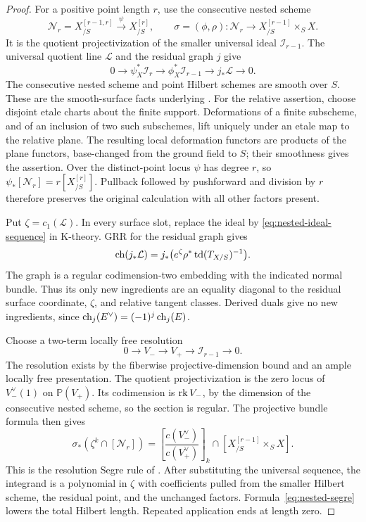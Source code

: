 \begin{proof}
For a positive point length \(r\), use the consecutive nested scheme
\[
 \mathcal N_r=X^{[r-1,r]}_{/S}
 \xrightarrow{\ \psi\ }X^{[r]}_{/S},\qquad
 \sigma=(\phi,\rho):\mathcal N_r\longrightarrow
 X^{[r-1]}_{/S}\times_S X .
 \]
It is the quotient projectivization of the smaller universal ideal
\(\mathcal I_{r-1}\). The universal quotient line \(\mathcal L\)
and the residual graph \(j\) give
\begin{equation}
\label{eq:nested-ideal-sequence}
 0\longrightarrow\psi_X^*\mathcal I_r
 \longrightarrow\phi_X^*\mathcal I_{r-1}
 \longrightarrow j_*\mathcal L\longrightarrow0.
\end{equation}
The consecutive nested scheme and point Hilbert schemes are smooth
over \(S\). These are the smooth-surface facts underlying
\cite[Section 1]{EGL}. For the relative assertion, choose disjoint
etale charts about the finite support. Deformations of a finite
subscheme, and of an inclusion of two such subschemes, lift uniquely
under an etale map to the relative plane. The resulting local
deformation functors are products of the plane functors, base-changed
from the ground field to \(S\); their smoothness gives the assertion.
Over the distinct-point locus \(\psi\) has degree \(r\), so
\(\psi_*[\mathcal N_r]=r[X^{[r]}_{/S}]\).
Pullback followed by pushforward and division by \(r\) therefore
preserves the original calculation with all other factors present.

Put \(\zeta=c_1(\mathcal L)\).
In every surface slot, replace the ideal by
\eqref{eq:nested-ideal-sequence} in K-theory.
GRR for the residual graph gives
\[
 \operatorname{ch}(j_*\mathcal L)
 =j_*\bigl(e^\zeta\rho^*\operatorname{td}(T_{X/S})^{-1}\bigr).
\]
The graph is a regular codimension-two embedding with the indicated
normal bundle. Thus its only new ingredients are an equality
diagonal to the residual surface coordinate, \(\zeta\), and relative
tangent classes.
Derived duals give no new ingredients, since
\(\operatorname{ch}_j(E^\vee)=(-1)^j\operatorname{ch}_j(E)\).

Choose a two-term locally free resolution
\[
 0\longrightarrow V_-\longrightarrow V_+
 \longrightarrow\mathcal I_{r-1}\longrightarrow0 .
\]
The resolution exists by the fiberwise projective-dimension bound
and an ample locally free presentation.
The quotient projectivization is the zero locus of
\(V_-^\vee(1)\) on \(\mathbb P(V_+)\).
Its codimension is \(\operatorname{rk} V_-\), by the dimension of the consecutive
nested scheme, so the section is regular.
The projective bundle formula then gives
\begin{equation}
\label{eq:nested-segre}
 \sigma_*(\zeta^k\cap[\mathcal N_r])
 =\left[\frac{c(V_-^\vee)}{c(V_+^\vee)}\right]_k
 \cap[X^{[r-1]}_{/S}\times_S X].
\end{equation}
This is the resolution Segre rule of
\cite[Section 1, Lemma 1.1]{EGL}.
After substituting the universal sequence, the integrand is a
polynomial in \(\zeta\) with coefficients pulled from the smaller
Hilbert scheme, the residual point, and the unchanged factors.
Formula~\eqref{eq:nested-segre} lowers the total Hilbert length.
Repeated application ends at length zero.


\end{proof}
